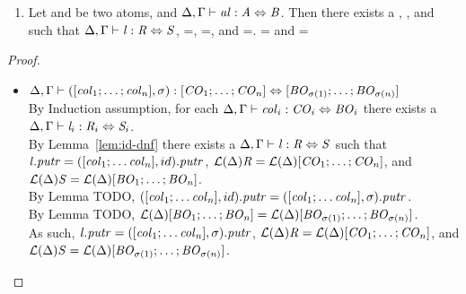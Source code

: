 \begin{lemma}
\begin{enumerate}
\item Let \Atom{} and \AtomAlt{} be two atoms, and $\Delta, \Gamma \vdash \mathit{al} : \mathit{A} \Leftrightarrow \mathit{B}$.  Then there exists a \Lens{}, \Regex{}, and \RegexAlt{} such that $\Delta, \Gamma \vdash \mathit{l} : \mathit{R} \Leftrightarrow \mathit{S}$, \PutRightOf{\Lens}=\PutRightOf{\AtomLens}, \LanguageOf{\Delta}{\Regex}=\LanguageOf{\Delta}{\Atom}, and \LanguageOf{\Delta}{\RegexAlt}=\LanguageOf{\Delta}{\AtomAlt}.  \LanguageOf{\Delta{}}{\Regex{}} = \LanguageOf{\Delta{}}{\Atom{}} and
\LanguageOf{\Delta{}}{\RegexAlt{}} = \LanguageOf{\Delta{}}{\AtomAlt{}}
\end{enumerate}
\begin{proof}
\begin{itemize}\leavevmode\\
\item $\Delta, \Gamma \vdash ([\mathit{col}_1;\ldots;\mathit{col}_n],\sigma) : [\mathit{CO}_1;\ldots;\mathit{CO}_n] \Leftrightarrow [\mathit{BO}_{\sigma(1)};\ldots;\mathit{BO}_{\sigma(n)}]$\\
By Induction assumption, for each $\Delta, \Gamma \vdash \mathit{col}_i : \mathit{CO}_i \Leftrightarrow \mathit{BO}_i$ there exists a $\Delta, \Gamma \vdash \mathit{l}_i : \mathit{R}_i \Leftrightarrow \mathit{S}_i$.\\
By Lemma~\ref{lem:id-dnf} there exists a $\Delta, \Gamma \vdash \mathit{l} : \mathit{R} \Leftrightarrow \mathit{S}$ such that $\mathit{l}.\mathit{putr}=([\mathit{col}_1;\ldots\mathit{col}_n],id).\mathit{putr}$,
$\mathcal{L}(\Delta){\mathit{R}}=\mathcal{L}(\Delta){[\mathit{CO}_1;\ldots;\mathit{CO}_n]}$, and
$\mathcal{L}(\Delta){\mathit{S}}=\mathcal{L}(\Delta){[\mathit{BO}_1;\ldots;\mathit{BO}_n]}$.\\
By Lemma TODO, $([\mathit{col}_1;\ldots\mathit{col}_n],id).\mathit{putr}=([\mathit{col}_1;\ldots\mathit{col}_n],\sigma).\mathit{putr}$.\\
By Lemma TODO, $\mathcal{L}(\Delta){[\mathit{BO}_1;\ldots;\mathit{BO}_n]}=\mathcal{L}(\Delta){[\mathit{BO}_{\sigma(1)};\ldots;\mathit{BO}_{\sigma(n)}]}$.\\
As such, $\mathit{l}.\mathit{putr}=([\mathit{col}_1;\ldots\mathit{col}_n],\sigma).\mathit{putr}$,
$\mathcal{L}(\Delta){\mathit{R}}=\mathcal{L}(\Delta){[\mathit{CO}_1;\ldots;\mathit{CO}_n]}$,
and $\mathcal{L}(\Delta){\mathit{S}}=\mathcal{L}(\Delta){[\mathit{BO}_{\sigma(1)};\ldots;\mathit{BO}_{\sigma(n)}]}$.\\


\end{itemize}
\end{proof}
\end{lemma}
